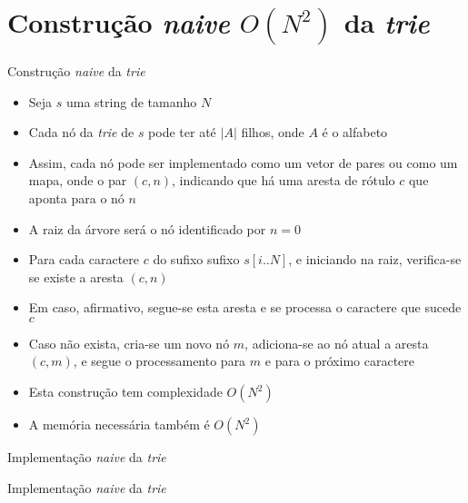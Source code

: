 \section{Construção {\it naive} $O(N^2)$ da {\it trie}}

\begin{frame}[fragile]{Construção {\it naive} da {\it trie}}

    \begin{itemize}
        \item Seja $s$ uma string de tamanho $N$

        \item Cada nó da {\it trie} de $s$ pode ter até $|A|$ filhos, onde $A$ é o alfabeto

        \item Assim, cada nó pode ser implementado como um vetor de pares ou como um mapa,
            onde o par $(c, n)$, indicando que há uma aresta de rótulo $c$ que aponta para o
            nó $n$

        \item A raiz da árvore será o nó identificado por $n = 0$

        \item Para cada caractere $c$ do sufixo sufixo $s[i..N]$, e iniciando na raiz,
            verifica-se se existe a aresta $(c, n)$

        \item Em caso, afirmativo, segue-se esta aresta e se processa o caractere que sucede $c$

        \item Caso não exista, cria-se um novo nó $m$, adiciona-se ao nó atual a aresta
            $(c, m)$, e segue o processamento para $m$ e para o próximo caractere
    
        \item Esta construção tem complexidade $O(N^2)$

        \item A memória necessária também é $O(N^2)$
    \end{itemize}

\end{frame}

\begin{frame}[fragile]{Implementação {\it naive} da {\it trie}}
\end{frame}

\begin{frame}[fragile]{Implementação {\it naive} da {\it trie}}
\end{frame}
